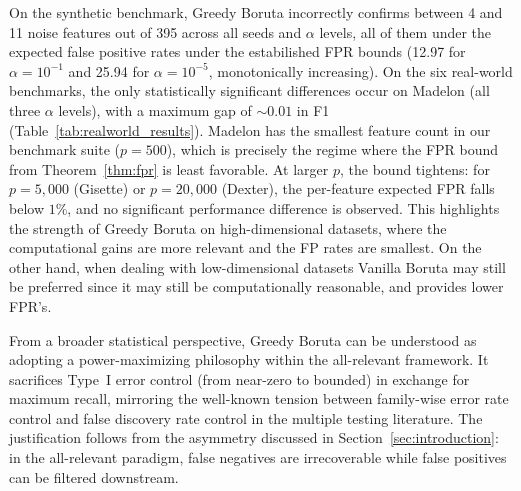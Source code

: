 \documentclass[runningheads]{llncs}
\begin{document}

On the synthetic benchmark, Greedy Boruta incorrectly confirms between 4 and 11 noise features out of 395 across all seeds and $\alpha$ levels, all of them under the expected false positive rates under the estabilished FPR bounds (12.97 for $\alpha=10^{-1}$ and 25.94 for $\alpha=10^{-5}$, monotonically increasing).
On the six real-world benchmarks, the only statistically significant differences occur on Madelon (all three $\alpha$ levels), with a maximum gap of ${\sim}0.01$ in F1 (Table~\ref{tab:realworld_results}). Madelon has the smallest feature count in our benchmark suite ($p = 500$), which is precisely the regime where the FPR bound from Theorem~\ref{thm:fpr} is least favorable. At larger $p$, the bound tightens: for $p = 5{,}000$ (Gisette) or $p = 20{,}000$ (Dexter), the per-feature expected FPR falls below $1\%$, and no significant performance difference is observed. This highlights the strength of Greedy Boruta on high-dimensional datasets, where the computational gains are more relevant and the FP rates are smallest. On the other hand, when dealing with low-dimensional datasets Vanilla Boruta may still be preferred since it may still be computationally reasonable, and provides lower FPR's. 


From a broader statistical perspective, Greedy Boruta can be understood as adopting a power-maximizing philosophy within the all-relevant framework. It sacrifices Type~I error control (from near-zero to bounded) in exchange for maximum recall, mirroring the well-known tension between family-wise error rate control and false discovery rate control in the multiple testing literature. The justification follows from the asymmetry discussed in Section~\ref{sec:introduction}: in the all-relevant paradigm, false negatives are irrecoverable while false positives can be filtered downstream.
\end{document}
